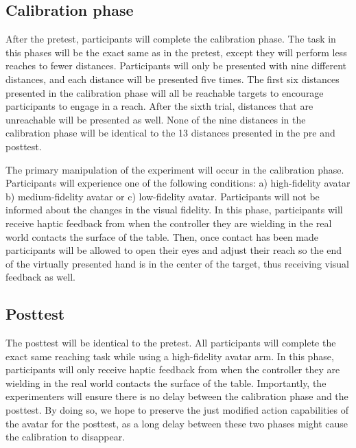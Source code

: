 \subsection{Calibration phase}
After the pretest, participants will complete the calibration phase. The task in this phases will be the exact same as in the pretest, except they will perform less reaches to fewer distances. Participants will only be presented with nine different distances, and each distance will be presented five times.  The first six distances presented in the calibration phase will all be reachable targets to encourage participants to engage in a reach.  After the sixth trial, distances that are unreachable will be presented as well. None of the nine distances in the calibration phase will be identical to the 13 distances presented in the pre and posttest. 

The primary manipulation of the experiment will occur in the calibration phase.  Participants will experience one of the following conditions: a) high-fidelity avatar b) medium-fidelity avatar or c) low-fidelity avatar. Participants will not be informed about the changes in the visual fidelity. In this phase, participants will receive haptic feedback from when the controller they are wielding in the real world contacts the surface of the table. Then, once contact has been made participants will be allowed to open their eyes and adjust their reach so the end of the virtually presented hand is in the center of the target, thus receiving visual feedback as well.

\subsection{Posttest}
The posttest will be identical to the pretest.  All participants will complete the exact same reaching task while using a high-fidelity avatar arm.  In this phase, participants will only receive haptic feedback from when the controller they are wielding in the real world contacts the surface of the table.
Importantly, the experimenters will ensure there is no delay between the calibration phase and the posttest. By doing so, we hope to preserve the just modified action capabilities of the avatar for the posttest, as a long delay between these two phases might cause the calibration to disappear.


